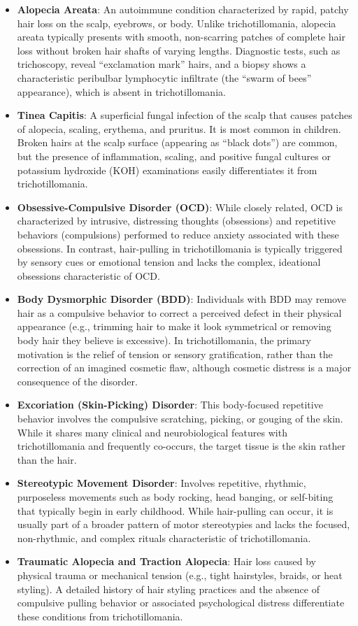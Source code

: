 \begin{itemize}
    \item \textbf{Alopecia Areata}: An autoimmune condition characterized by rapid, patchy hair loss on the scalp, eyebrows, or body. Unlike trichotillomania, alopecia areata typically presents with smooth, non-scarring patches of complete hair loss without broken hair shafts of varying lengths. Diagnostic tests, such as trichoscopy, reveal ``exclamation mark'' hairs, and a biopsy shows a characteristic peribulbar lymphocytic infiltrate (the ``swarm of bees'' appearance), which is absent in trichotillomania.
    \item \textbf{Tinea Capitis}: A superficial fungal infection of the scalp that causes patches of alopecia, scaling, erythema, and pruritus. It is most common in children. Broken hairs at the scalp surface (appearing as ``black dots'') are common, but the presence of inflammation, scaling, and positive fungal cultures or potassium hydroxide (KOH) examinations easily differentiates it from trichotillomania.
    \item \textbf{Obsessive-Compulsive Disorder (OCD)}: While closely related, OCD is characterized by intrusive, distressing thoughts (obsessions) and repetitive behaviors (compulsions) performed to reduce anxiety associated with these obsessions. In contrast, hair-pulling in trichotillomania is typically triggered by sensory cues or emotional tension and lacks the complex, ideational obsessions characteristic of OCD.
    \item \textbf{Body Dysmorphic Disorder (BDD)}: Individuals with BDD may remove hair as a compulsive behavior to correct a perceived defect in their physical appearance (e.g., trimming hair to make it look symmetrical or removing body hair they believe is excessive). In trichotillomania, the primary motivation is the relief of tension or sensory gratification, rather than the correction of an imagined cosmetic flaw, although cosmetic distress is a major consequence of the disorder.
    \item \textbf{Excoriation (Skin-Picking) Disorder}: This body-focused repetitive behavior involves the compulsive scratching, picking, or gouging of the skin. While it shares many clinical and neurobiological features with trichotillomania and frequently co-occurs, the target tissue is the skin rather than the hair.
    \item \textbf{Stereotypic Movement Disorder}: Involves repetitive, rhythmic, purposeless movements such as body rocking, head banging, or self-biting that typically begin in early childhood. While hair-pulling can occur, it is usually part of a broader pattern of motor stereotypies and lacks the focused, non-rhythmic, and complex rituals characteristic of trichotillomania.
    \item \textbf{Traumatic Alopecia and Traction Alopecia}: Hair loss caused by physical trauma or mechanical tension (e.g., tight hairstyles, braids, or heat styling). A detailed history of hair styling practices and the absence of compulsive pulling behavior or associated psychological distress differentiate these conditions from trichotillomania.
\end{itemize}


